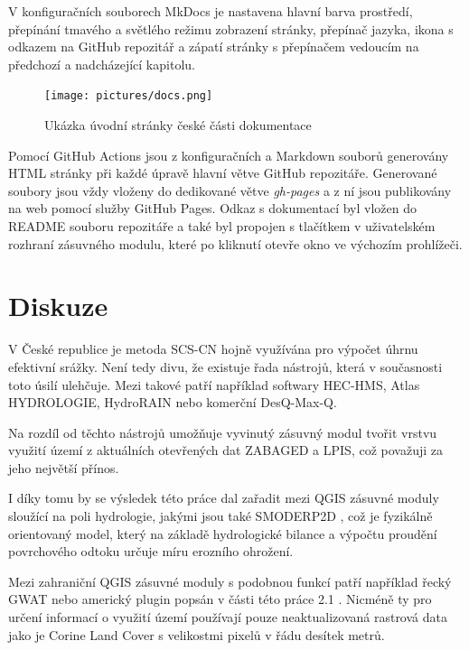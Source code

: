 \documentclass[a4paper,oneside,12pt]{book}
\begin{document}
\hspace{10mm} V konfiguračních souborech MkDocs je nastavena hlavní barva prostředí, přepínání tmavého a světlého režimu zobrazení stránky, přepínač jazyka, ikona s odkazem na GitHub repozitář a zápatí stránky s přepínačem vedoucím na předchozí a nadcházející kapitolu.

\begin{figure}[H] \label{obr23}
\centering
\texttt{[image: pictures/docs.png]}
\caption{Ukázka úvodní stránky české části dokumentace}
\label{fig:docs}
\end{figure}

\hspace{10mm} Pomocí GitHub Actions jsou z konfiguračních a Markdown souborů generovány HTML stránky při každé úpravě hlavní větve GitHub repozitáře. Generované soubory jsou vždy vloženy do dedikované větve \textit{gh-pages} a z ní jsou publikovány na web pomocí služby GitHub Pages. Odkaz s dokumentací byl vložen do README souboru repozitáře a také byl propojen s tlačítkem v uživatelském rozhraní zásuvného modulu, které po kliknutí otevře okno ve výchozím prohlížeči.

\chapter*{Diskuze} \label{discusion}
\hspace{10mm} V České republice je metoda SCS-CN hojně využívána pro výpočet úhrnu efektivní srážky. Není tedy divu, že existuje řada nástrojů, která v současnosti toto úsilí ulehčuje. Mezi takové patří například softwary HEC-HMS, Atlas HYDROLOGIE, HydroRAIN nebo komerční DesQ-Max-Q. \cite{MNYDGwleJOjKLRU2}

\hspace{10mm} Na rozdíl od těchto nástrojů umožňuje vyvinutý zásuvný modul tvořit vrstvu využití území z aktuálních otevřených dat ZABAGED a LPIS, což považuji za jeho největší přínos. 

\hspace{10mm} I díky tomu by se výsledek této práce dal zařadit mezi QGIS zásuvné moduly sloužící na poli hydrologie, jakými jsou také SMODERP2D \cite{Kavka2024}, což je fyzikálně orientovaný model, který na základě hydrologické bilance a výpočtu proudění povrchového odtoku určuje míru erozního ohrožení.

\hspace{10mm} Mezi zahraniční QGIS zásuvné moduly s podobnou funkcí patří například řecký GWAT \cite{lymperis2024} nebo americký plugin \cite{siddiqui2020} popsán v části této práce 2.1 . Nicméně ty pro určení informací o využití území používají pouze neaktualizovaná rastrová data jako je Corine Land Cover s velikostmi pixelů v řádu desítek metrů.
\end{document}
